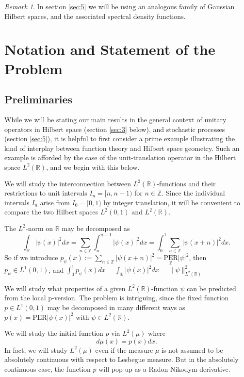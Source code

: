 \documentclass{birkmult}
\theoremstyle{definition}
\theoremstyle{remark}
\newtheorem{rem}[thm]{Remark}
\numberwithin{equation}{section}
\begin{document}
\begin{rem}
\label{R:1.2}
In section \ref{sec:5} we will be using an analogous family of Gaussian 
Hilbert spaces, and the associated spectral density functions.  
\end{rem}

\section{Notation and Statement of the Problem}
\label{sec:2}
\subsection*{Preliminaries}
While we will be stating our main results in the general context of 
unitary operators in Hilbert space (section \ref{sec:3} below), and 
stochastic processes (section \ref{sec:5}), it is helpful to first consider 
a prime example illustrating the kind of interplay between function theory 
and Hilbert space geometry. Such an example is afforded by the case of the 
unit-translation operator in the Hilbert space $L^{2}(\mathbb{R})$, and we 
begin with this below.

We will study the interconnection between $L^{2}(\mathbb{R})$-functions 
and their restrictions to unit intervals $I_{n}=[n,n+1)$ for 
$n \in \mathbb{Z}$.  Since the individual intervals $I_{n}$ arise from
$I_{0}=[0,1)$ by integer translation, it will be convenient to compare
the two Hilbert spaces $L^{2}(0,1)$ and $L^{2}(\mathbb{R})$.  

The $L^{2}$-norm on $\mathbb{R}$ may be decomposed as 
\[
  \int_{\mathbb{R}}|\psi(x)|^{2}dx 
  = \sum_{n \in \mathbb{Z}} \int_{n}^{n+1} |\psi(x)|^{2}dx
  = \int_{0}^{1} \sum_{n \in \mathbb{Z}} |\psi(x+n)|^{2}dx.
\]
So if we introduce $p_{\psi}(x):=\sum_{n\in\mathbb{Z}}|\psi(x+n)|^{2}
= \underset{\mathbb{Z}}{\text{PER}}|\psi|^{2}$, then $p_{\psi} \in L^{1}(0,1)$, and 
$\int_{0}^{1}p_{\psi}(x)dx=\int_{\mathbb{R}}|\psi(x)|^{2}dx
=\|\psi\|_{L^{2}(\mathbb{R})}^{2}$

We will study what properties of a given $L^{2}(\mathbb{R})$-function $\psi$
can be predicted from the local p-version.  The problem is intriguing, since
the fixed function $p \in L^{1}(0,1)$ may be decomposed in many different 
ways as $p(x)=\text{PER}|\psi(x)|^{2}$ with $\psi \in L^{2}(\mathbb{R})$.

We will study the initial function $p$ via $L^{2}(\mu)$ where 
\begin{equation}
\label{E:mu}
  d\mu(x)=p(x)dx.
\end{equation}
In fact, we will study $L^{2}(\mu)$ even if the measure $\mu$ is not assumed
to be absolutely continuous with respect to Lesbegue measure.  But in the
absolutely continuous case, the function $p$ will pop up as a Radon-Nikodym
derivative.  
\end{document}
